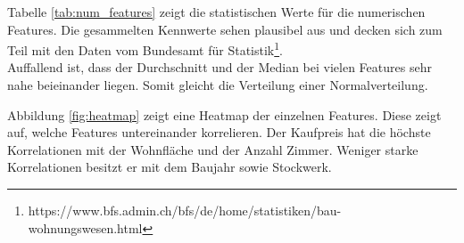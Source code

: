 \newline
%
Tabelle \ref{tab:num_features} zeigt die statistischen Werte für die numerischen Features. Die gesammelten Kennwerte sehen plausibel aus und decken sich zum Teil mit den Daten vom Bundesamt für Statistik\footnote{https://www.bfs.admin.ch/bfs/de/home/statistiken/bau-wohnungswesen.html}.\\
Auffallend ist, dass der Durchschnitt und der Median bei vielen Features sehr nahe beieinander liegen. Somit gleicht die Verteilung einer Normalverteilung.\\[2ex]
%
\begin{table}[ht]
\centering
{}
\caption{Statistische Werte der nummerischen Features}
\label{tab:num_features}
\end{table}
%
Abbildung \ref{fig:heatmap} zeigt eine Heatmap der einzelnen Features. Diese zeigt auf, welche Features  untereinander korrelieren. Der Kaufpreis hat die höchste Korrelationen mit der Wohnfläche und der Anzahl Zimmer. Weniger starke Korrelationen besitzt er mit dem Baujahr sowie Stockwerk.
%
